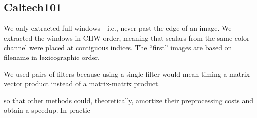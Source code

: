 
\subsection{Caltech101}

We only extracted full windows---i.e., never past the edge of an image. We extracted the windows in CHW order, meaning that scalars from the same color channel were placed at contiguous indices. The ``first'' images are based on filename in lexicographic order.

We used pairs of filters because using a single filter would mean timing a matrix-vector product instead of a matrix-matrix product.

so that other methods could, theoretically, amortize their preprocessing costs and obtain a speedup. In practic
